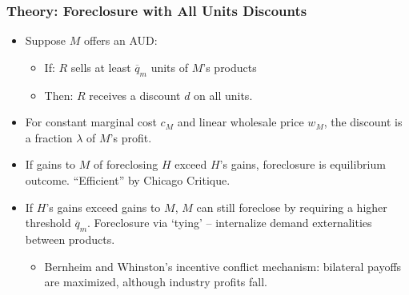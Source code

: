 \documentclass[aspectratio=169]{beamer}
\begin{document}
\begin{frame}
\frametitle{Theory: Foreclosure with All Units Discounts}
\begin{itemize}
\item Suppose $M$ offers an AUD:
	\begin{itemize}
	\item If: $R$ sells at least $\overline{q}_m$ units of $M$'s products 
	\item Then: $R$ receives a discount $d$ on all units.
	\end{itemize}
\item For constant marginal cost $c_M$ and linear wholesale price $w_M$, the discount is a fraction $\lambda$ of $M$'s profit.
	\item If gains to $M$ of foreclosing $H$ exceed $H$'s gains, foreclosure is equilibrium outcome. ``Efficient'' by Chicago Critique.
	\item If $H$'s gains exceed gains to $M$, $M$ can still foreclose by requiring a higher threshold $\overline{q}_m$. Foreclosure via `tying' -- internalize demand externalities between products.
	\begin{itemize}
	\item Bernheim and Whinston's incentive conflict mechanism: bilateral payoffs are maximized, although industry profits fall.
	\end{itemize}
\end{itemize}
\hyperlink{supplemental}{}
\end{frame}
\end{document}
